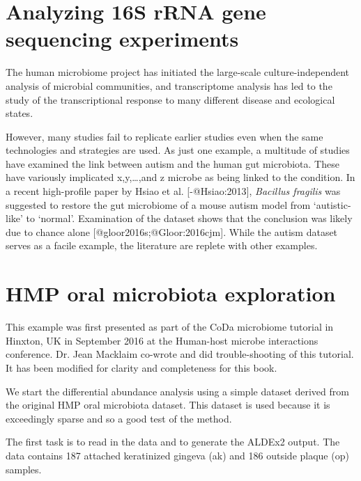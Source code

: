 \documentclass[
  onecolumn]{article}
\begin{document}
\hypertarget{analyzing-16s-rrna-gene-sequencing-experiments}{%
\section{Analyzing 16S rRNA gene sequencing experiments}\label{analyzing-16s-rrna-gene-sequencing-experiments}}

The human microbiome project has initiated the large-scale culture-independent analysis of microbial communities, and transcriptome analysis has led to the study of the transcriptional response to many different disease and ecological states.

However, many studies fail to replicate earlier studies even when the same technologies and strategies are used. As just one example, a multitude of studies have examined the link between autism and the human gut microbiota. These have variously implicated x,y,\ldots,and z microbe as being linked to the condition. In a recent high-profile paper by Hsiao et al. {[}-@Hsiao:2013{]}, \emph{Bacillus fragilis} was suggested to restore the gut microbiome of a mouse autism model from `autistic-like' to `normal'. Examination of the dataset shows that the conclusion was likely due to chance alone {[}@gloor2016s;@Gloor:2016cjm{]}. While the autism dataset serves as a facile example, the literature are replete with other examples.

\hypertarget{oral}{%
\section{HMP oral microbiota exploration}\label{oral}}

\hspace{2cm}\begin{minipage}[ct]{10cm}
\parskip=5pt
\parindent=5pt
This example was first presented as part of the CoDa microbiome tutorial in Hinxton, UK in September 2016 at the Human-host microbe interactions conference. Dr. Jean Macklaim co-wrote and did trouble-shooting of this tutorial. It has been modified for clarity and completeness for this book.
\end{minipage}
\vspace{1cm}

We start the differential abundance analysis using a simple dataset derived from the original HMP oral microbiota dataset. This dataset is used because it is exceedingly sparse and so a good test of the method.

The first task is to read in the data and to generate the ALDEx2 output. The data contains 187 attached keratinized gingeva (ak) and 186 outside plaque (op) samples.
\end{document}
